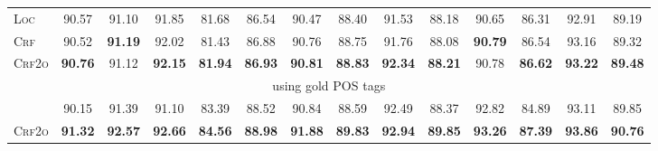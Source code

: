 \begin{table*}[tb]
\begin{tabularx}{\textwidth}{lccccccccccccc}
    \textsc{Loc}                      & 90.57          & 91.10          & 91.85                            & 81.68                           & 86.54                           & 90.47                            & 88.40                           & 91.53                            & 88.18                            & 90.65                           & 86.31                            & 92.91                            & 89.19                            \\
    \textsc{Crf}                      & 90.52          & \textbf{91.19} & 92.02                            & 81.43                           & 86.88\rlap{$^\dagger$}          & 90.76\rlap{$^\dagger$}           & 88.75                           & 91.76                            & 88.08                            & \textbf{90.79}                  & 86.54                            & 93.16\rlap{$^\ddagger$}          & 89.32\rlap{$^\ddagger$}          \\
    \textsc{Crf2o}                    & \textbf{90.76} & 91.12          & \textbf{92.15}\rlap{$^\ddagger$} & \textbf{81.94}                  & \textbf{86.93}\rlap{$^\dagger$} & \textbf{90.81}\rlap{$^\ddagger$} & \textbf{88.83}\rlap{$^\dagger$} & \textbf{92.34}\rlap{$^\ddagger$} & \textbf{88.21}\rlap{$^\dagger$}  & 90.78                           & \textbf{86.62}                   & \textbf{93.22}\rlap{$^\ddagger$} & \textbf{89.48}\rlap{$^\ddagger$} \\
    \multicolumn{14}{c}{using gold POS tags}                                                                                                                                                                                                                                                                                                                                                                                                                         \\[1pt]
    \citet{zhang-etal-2019-empirical} & 90.15          & 91.39          & 91.10                            & 83.39                           & 88.52                           & 90.84                            & 88.59                           & 92.49                            & 88.37                            & 92.82                           & 84.89                            & 93.11                            & 89.85                            \\
    \textsc{Crf2o}                    & \textbf{91.32} & \textbf{92.57} & \textbf{92.66}                   & \textbf{84.56}                  & \textbf{88.98}                  & \textbf{91.88}                   & \textbf{89.83}                  & \textbf{92.94}                   & \textbf{89.85}                   & \textbf{93.26}                  & \textbf{87.39}                   & \textbf{93.86}                   & \textbf{90.76}                   \\
    \bottomrule
  \end{tabularx}
  \label{table:ud-test}
\end{table*}

